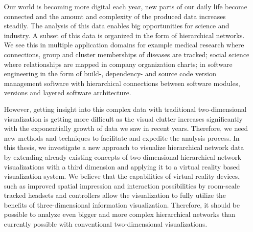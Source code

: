 Our world is becoming more digital each year, new parts of our daily life become connected and the amount and complexity of the produced data increases steadily.
The analysis of this data enables big opportunities for science and industry.
A subset of this data is organized in the form of hierarchical networks. We see this in multiple application domains for example medical research where connections, group and cluster memberships of diseases are tracked; social science where relationships are mapped in company organization charts; in software engineering in the form of build-, dependency- and source code version management software with hierarchical connections between software modules, versions and layered software architecture.

However, getting insight into this complex data with traditional two-dimensional visualization is getting more difficult as the visual clutter increases significantly with the exponentially growth of data we saw in recent years. Therefore, we need new methods and techniques to facilitate and expedite the analysis process.
In this thesis, we investigate a new approach to visualize hierarchical network data by extending already existing concepts of two-dimensional hierarchical network visualizations with a third dimension and applying it to a virtual reality based visualization system. We believe that the capabilities of virtual reality devices, such as improved spatial impression and interaction possibilities by room-scale tracked headsets and controllers allow the visualization to fully utilize the benefits of three-dimensional information visualization. Therefore, it should be possible to analyze even bigger and more complex hierarchical networks than currently possible with conventional two-dimensional visualizations.